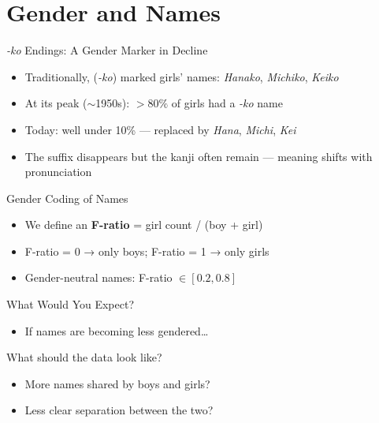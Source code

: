 \documentclass{beamer}
\begin{document}
\section{Gender and Names}

\begin{frame}{\textit{-ko} Endings: A Gender Marker in Decline}
  \begin{itemize}
    \item Traditionally,  (\textit{-ko}) marked girls' names:
      \textit{Hanako}, \textit{Michiko}, \textit{Keiko}
    \item At its peak ($\sim$1950s): $>80\%$ of girls had a \textit{-ko} name
    \item Today: well under 10\% --- replaced by \textit{Hana}, \textit{Michi},
      \textit{Kei}
    \item The suffix disappears but the kanji often remain ---
      meaning shifts with pronunciation
  \end{itemize}
\end{frame}

\begin{frame}{Gender Coding of Names}
  \begin{itemize}
    \item We define an \textbf{F-ratio} = girl count / (boy + girl)
    \item F-ratio = 0 → only boys; F-ratio = 1 → only girls
    \item Gender-neutral names: F-ratio $\in [0.2, 0.8]$
  \end{itemize}
\end{frame}

\begin{frame}{What Would You Expect?}
  \begin{itemize}
    \item If names are becoming less gendered\ldots
  \end{itemize}
  \vspace{1em}
  \pause
  \begin{center}
    \Large What should the data look like?
  \end{center}
  \vspace{1em}
  \pause
  \begin{itemize}
    \item More names shared by boys and girls?
    \item Less clear separation between the two?
  \end{itemize}
\end{frame}
\end{document}
